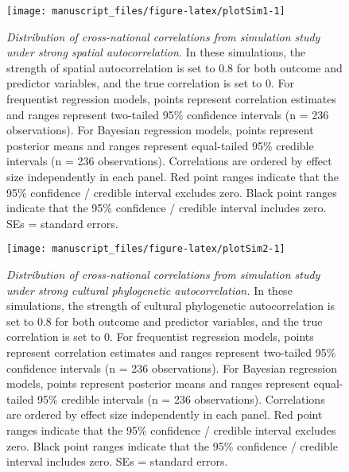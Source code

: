 \documentclass[
  man,floatsintext]{apa6}
\begin{document}
\newpage



\begin{figure}[H]
\texttt{[image: manuscript\_files/figure-latex/plotSim1-1]} \caption{\emph{Distribution of cross-national correlations from simulation study under strong spatial autocorrelation.} In these simulations, the strength of spatial autocorrelation is set to 0.8 for both outcome and predictor variables, and the true correlation is set to 0. For frequentist regression models, points represent correlation estimates and ranges represent two-tailed 95\% confidence intervals (n = 236 observations). For Bayesian regression models, points represent posterior means and ranges represent equal-tailed 95\% credible intervals (n = 236 observations). Correlations are ordered by effect size independently in each panel. Red point ranges indicate that the 95\% confidence / credible interval excludes zero. Black point ranges indicate that the 95\% confidence / credible interval includes zero. SEs = standard errors.}\label{fig:plotSim1}
\end{figure}

\newpage



\begin{figure}[H]
\texttt{[image: manuscript\_files/figure-latex/plotSim2-1]} \caption{\emph{Distribution of cross-national correlations from simulation study under strong cultural phylogenetic autocorrelation.} In these simulations, the strength of cultural phylogenetic autocorrelation is set to 0.8 for both outcome and predictor variables, and the true correlation is set to 0. For frequentist regression models, points represent correlation estimates and ranges represent two-tailed 95\% confidence intervals (n = 236 observations). For Bayesian regression models, points represent posterior means and ranges represent equal-tailed 95\% credible intervals (n = 236 observations). Correlations are ordered by effect size independently in each panel. Red point ranges indicate that the 95\% confidence / credible interval excludes zero. Black point ranges indicate that the 95\% confidence / credible interval includes zero. SEs = standard errors.}\label{fig:plotSim2}
\end{figure}

\newpage
\end{document}
